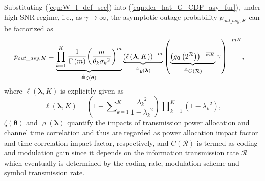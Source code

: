 \documentclass[12pt,onecolumn,draftcls]{IEEEtran}
\newcommand{\bs}{\boldsymbol}
\newtheorem{remark}{Remark}
\begin{document}
Substituting (\ref{eqn:W_l_def_sec}) into (\ref{eqn:der_hat_G_CDF_asy_fur}), under high SNR regime, i.e., as $\gamma \to \infty$, the asymptotic outage probability ${p_{out\_{asy},K}}$ can be factorized as
\begin{align}\label{eqn:der_hat_G_CDF_asy_furre}
{p_{out\_{asy},K}} &= \underbrace {\prod\limits_{k = 1}^K {\frac{1}{{\Gamma \left( m \right)}}{{\left( {\frac{m}{{{\theta _k}{\sigma _k}^2}}} \right)}^m}} }_{\triangleq \zeta(\bs \theta)} \underbrace {{{\left( {\ell \left( {\bs \lambda ,K} \right)} \right)}^{ - m}}}_{\triangleq \varrho(\bs \lambda)} {\left( {\underbrace {{{\left( {{g_{\bf{0}}}\left(  2^{\cal R} \right)} \right)}^{ - \frac{1}{mK}}}}_{\triangleq {C}(\mathcal R)}\gamma } \right)^{ - mK}},
\end{align}
where $\ell \left( {{\bs{\lambda }},K} \right)$ is explicitly given as
 \begin{equation}\label{eqn:ell_def}
\ell \left( {{\bs{\lambda }},K} \right) = \left( {1 + \sum\nolimits_{k = 1}^K {\frac{{{\lambda _k}^2}}{{1 - {\lambda _k}^2}}} } \right)\prod\nolimits_{k = 1}^K {\left( {1 - {\lambda _k}^2} \right)},
\end{equation}
$\zeta (\bs \theta)$ and $\varrho(\bs \lambda)$ quantify the impacts of transmission power allocation and channel time correlation and thus are regarded as power allocation impact factor and time correlation impact factor, respectively, and $C(\mathcal R)$ is termed as coding and modulation gain since it depends on the information transmission rate $\mathcal R$ which eventually is determined by the coding rate, modulation scheme and symbol transmission rate.

\end{document}
